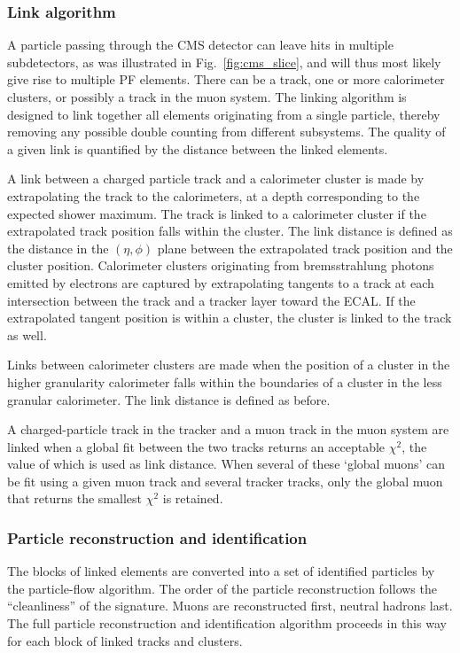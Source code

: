 \subsubsection{Link algorithm}

A particle passing through the CMS detector can leave hits in multiple subdetectors, as was
illustrated in Fig.~\ref{fig:cms_slice}, and will thus most likely give rise to multiple PF
elements. There can be a track, one or more calorimeter clusters, or possibly a track in the muon
system. The linking algorithm is designed to link together all elements originating from a single
particle, thereby removing any possible double counting from different subsystems. The quality of a
given link is quantified by the distance between the linked elements. 

A link between a charged particle track and a calorimeter cluster is made by extrapolating the
track to the calorimeters, at a depth corresponding to the expected shower maximum. The track is
linked to a calorimeter cluster if the extrapolated track position falls within the cluster. The
link distance is defined as the distance in the $(\eta,\phi)$ plane between the extrapolated track
position and the cluster position.  
Calorimeter clusters originating from bremsstrahlung photons emitted by electrons are captured by
extrapolating tangents to a track at each intersection between the track and a tracker layer
toward the ECAL. If the extrapolated tangent position is within a cluster, the cluster is linked to
the track as well.

Links between calorimeter clusters are made when the position of a cluster in the higher granularity
calorimeter falls within the boundaries of a cluster in the less granular calorimeter. The link
distance is defined as before. 

A charged-particle track in the tracker and a muon track in the muon system are linked when a global
fit between the two tracks returns an acceptable $\chi^2$, the value of which is used as link
distance. When several of these `global muons' can be fit using a given muon track and several
tracker tracks, only the global muon that returns the smallest $\chi^2$ is retained. 


\subsubsection{Particle reconstruction and identification}

The blocks of linked elements are converted into a set of identified particles by the particle-flow
algorithm. The order of the particle reconstruction follows the ``cleanliness'' of the signature.
Muons are reconstructed first, neutral hadrons last. The full particle reconstruction and
identification
algorithm proceeds in this way for each block of linked tracks and clusters. 


